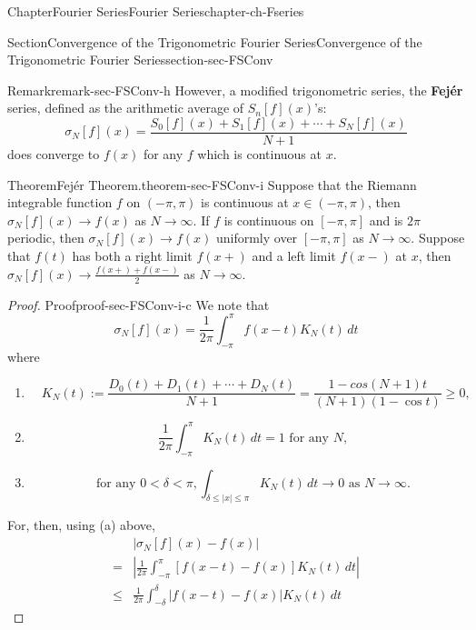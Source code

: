 \documentclass[oneside,10pt,]{book}
\newcommand{\terminology}[1]{\textbf{#1}}
\numberwithin{equation}{section}
\newcommand{\amp}{&}
\begin{document}
\begin{chapterptx}{Chapter}{Fourier Series}{}{Fourier Series}{}{}{chapter-ch-Fseries}
\begin{sectionptx}{Section}{Convergence of the Trigonometric Fourier Series}{}{Convergence of the Trigonometric Fourier Series}{}{}{section-sec-FSConv}
\begin{remark}{Remark}{}{remark-sec-FSConv-h}
However, a modified trigonometric series, the \terminology{Fejér} series, defined as the arithmetic average of \(S_{n}[f] (x)\)'s:%
\begin{equation*}
\sigma_{N}[f](x)=\frac{S_{0}[f](x)+S_{1}[f](x)+\cdots+S_N[f]( x)}{N+1}
\end{equation*}
does converge to \(f(x)\) for any \(f\) which is continuous at \(x\).%
\end{remark}
\begin{theorem}{Theorem}{Fejér Theorem.}{}{theorem-sec-FSConv-i}%
Suppose that the Riemann integrable function \(f\) on \((-\pi, \pi)\) is continuous at \(x\in (-\pi, \pi)\), then \(\sigma_{N}[f](x)\to f(x)\) as \(N\to \infty\). If \(f\) is continuous on \([-\pi, \pi]\) and is \(2\pi\) periodic, then \(\sigma_{N}[f](x)\to f(x)\) uniformly over \([-\pi, \pi]\) as \(N\to \infty\). Suppose that \(f(t)\) has both a right limit \(f(x+)\) and a left limit \(f(x-)\) at \(x\),  then \(\sigma_{N}[f](x)\to \frac{f(x+)+f(x-)}{2}\) as \(N\to \infty\).\end{theorem}
\begin{proof}{Proof}{}{proof-sec-FSConv-i-c}
We note that%
\begin{equation*}
\sigma_{N}[f](x)= \frac{1}{2\pi} \int_{-\pi}^{\pi}f(x-t) K_{N}(t)\, dt
\end{equation*}
where%
\begin{enumerate}[label=(\alph*)]
\item{}%
\begin{equation*}
\quad K_{N}(t):=\frac{D_{0}(t)+D_{1}(t)+\cdots+D_{N}(t)}{N+1}
=\frac{1-cos(N+1)t}{(N+1)(1-\cos t)}\ge 0,
\end{equation*}
%
\item{}%
\begin{equation*}
\quad \frac{1}{2\pi} \int_{-\pi}^{\pi}K_{N}(t)\, dt=1  \text{ for any } N,
\end{equation*}
%
\item{}%
\begin{equation*}
\quad \text{for any } 0 < \delta <\pi, \int_{\delta \le |x|\le \pi} K_{N}(t)\, dt \to 0 \text{ as } N\to \infty.
\end{equation*}
%
\end{enumerate}
For, then, using (a) above,%
\begin{align*}
\amp |\sigma_{N}[f](x)-f(x)|\\
= \amp |\frac{1}{2\pi} \int_{-\pi}^{\pi}[f(x-t) -f(x)] K_{N}(t)\, dt|\\
\le  \amp \frac{1}{2\pi} \int_{-\delta}^{\delta}|f(x-t) -f(x)| K_{N}(t)\, dt

\end{align*}
\end{proof}
\end{sectionptx}
\end{chapterptx}
\end{document}
